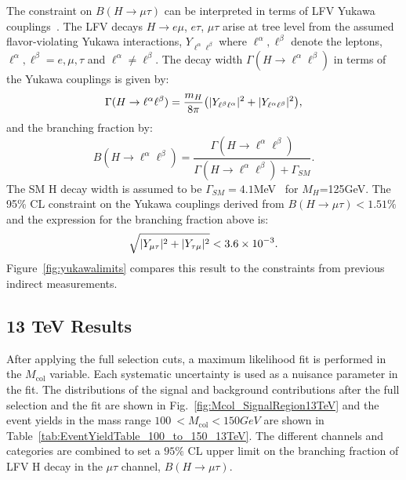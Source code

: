 \documentclass[oneside, letterpaper, oldfontcommands]{memoir}
\DeclarePairedDelimiter{\abs}{\lvert}{\rvert}
\begin{document}
The constraint on $B(H \rightarrow \mu \tau )$ can be interpreted in terms of LFV  Yukawa couplings~\cite{Harnik:2012pb}.
The LFV decays $H \rightarrow e\mu$, $e\tau$, $\mu\tau$ arise at tree level from the assumed
flavor-violating Yukawa interactions, $Y_{\ell^{\alpha}\ell^{\beta}}$ where $\ell^{\alpha},\ell^{\beta}$ denote the leptons, $\ell^{\alpha},\ell^{\beta}=e,\mu,\tau$ and $\ell^{\alpha}\neq \ell^{\beta}$.
The decay width $\Gamma(H \rightarrow \ell^{\alpha}\ell^{\beta})$  in terms of the Yukawa couplings is given by:
\begin{equation*}
\Gamma(H \rightarrow \ell^{\alpha}\ell^{\beta})=\frac{m_{H}}{8\pi}\bigl(\abs{Y_{\ell^{\beta}\ell^{\alpha}}}^2 + \abs{Y_{\ell^{\alpha}\ell^{\beta}}}^2\bigr),
\end{equation*}
and the branching fraction by:
\begin{equation*}
B(H \rightarrow \ell^{\alpha}\ell^{\beta})=\frac{\Gamma(H\rightarrow \ell^{\alpha}\ell^{\beta})}{\Gamma(H\rightarrow \ell^{\alpha}\ell^{\beta}) + \Gamma_{SM}}.
\end{equation*}
The SM H decay width is assumed to be $\Gamma_{SM}=4.1$MeV~\cite{Denner:2011mq} for $M_{H}$=125GeV.
The 95\% CL constraint on the Yukawa couplings derived from $B(H \rightarrow \mu \tau )<1.51\%$ and the expression for the branching fraction above is:\begin{equation*}
\sqrt{\abs{Y_{\mu\tau}}^{2}+\abs{Y_{\tau\mu}}^{2}}<3.6\times 10^{-3}.
\end{equation*}
Figure~\ref{fig:yukawalimits} compares this result to the constraints from previous indirect
measurements.
\subsection{13 TeV Results}
After applying the full selection cuts, a maximum likelihood fit is performed in the $M_\text{col}$ variable. Each systematic uncertainty is used as a nuisance parameter in the fit. The distributions of the signal and background contributions after the full selection and the fit are shown in Fig.~\ref{fig:Mcol_SignalRegion13TeV} and the
event yields in the mass range $100\:  < M_\text{col} < 150GeV$ are shown in Table~\ref{tab:EventYieldTable_100_to_150_13TeV}.
The different channels and categories are combined  to set a $95\%$ CL  upper limit on the branching
fraction of LFV H decay in the  $\mu\tau$ channel, $B(H\rightarrow\mu\tau)$.
\end{document}
